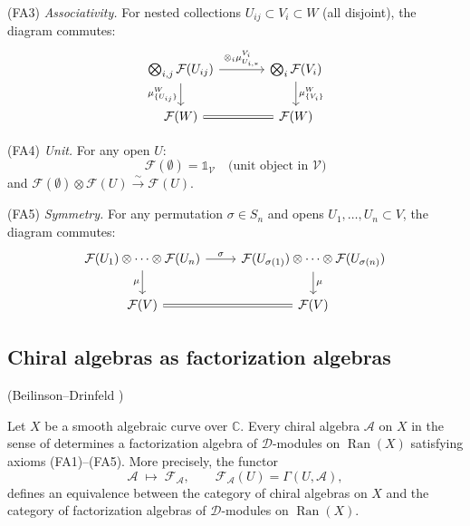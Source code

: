 \begin{definition}
(FA3) \emph{Associativity.} For nested collections
$U_{ij} \subset V_i \subset W$ (all disjoint), the diagram commutes:
\[\begin{tikzcd}[column sep=large]
\bigotimes_{i,j} \mathcal{F}(U_{ij})
   \arrow[r, "{\otimes_i \mu_{U_{i,*}}^{V_i}}"]
   \arrow[d, "{\mu_{\{U_{ij}\}}^W}"'] &
\bigotimes_i \mathcal{F}(V_i)
   \arrow[d, "{\mu_{\{V_i\}}^W}"] \\
\mathcal{F}(W) \arrow[r, equal] & \mathcal{F}(W)
\end{tikzcd}\]

(FA4) \emph{Unit.} For any open $U$:
\[\mathcal{F}(\emptyset) = \mathbb{1}_{\mathcal{V}}
   \quad \text{(unit object in } \mathcal{V}\text{)}\]
and $\mathcal{F}(\emptyset) \otimes \mathcal{F}(U) \xrightarrow{\sim} \mathcal{F}(U)$.

(FA5) \emph{Symmetry.} For any permutation $\sigma \in S_n$ and opens
$U_1, \ldots, U_n \subset V$, the diagram commutes:
\[\begin{tikzcd}
\mathcal{F}(U_1) \otimes \cdots \otimes \mathcal{F}(U_n)
   \arrow[r, "\sigma"] \arrow[d, "\mu"'] &
\mathcal{F}(U_{\sigma(1)}) \otimes \cdots \otimes \mathcal{F}(U_{\sigma(n)})
   \arrow[d, "\mu"] \\
\mathcal{F}(V) \arrow[r, equal] & \mathcal{F}(V)
\end{tikzcd}\]
\end{definition}

\subsection{Chiral algebras as factorization algebras}

\begin{theorem}
\label{thm:chiral-factorization}
\textup{(Beilinson--Drinfeld \cite[Theorem~3.4.9, \S3.4.10--3.4.12]{BD04})}

Let $X$ be a smooth algebraic curve over $\mathbb{C}$.
Every chiral algebra $\mathcal{A}$ on $X$ in the sense of
\cite[\S3.3]{BD04} determines a factorization algebra of
$\mathcal{D}$-modules on $\operatorname{Ran}(X)$ satisfying
axioms (FA1)--(FA5).  More precisely, the functor
\[\mathcal{A} \;\longmapsto\; \mathcal{F}_{\mathcal{A}},
\qquad \mathcal{F}_{\mathcal{A}}(U) = \Gamma(U, \mathcal{A}),\]
defines an equivalence between the category of chiral algebras
on $X$ and the category of factorization algebras of
$\mathcal{D}$-modules on $\operatorname{Ran}(X)$.
\end{theorem}

